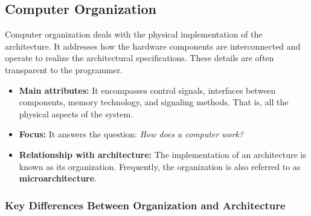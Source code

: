 \subsection{Computer Organization}
Computer organization deals with the physical implementation of the architecture. It addresses how the hardware components are interconnected and operate to realize the architectural specifications. These details are often transparent to the programmer.

\begin{itemize}
    \item \textbf{Main attributes:} It encompasses control signals, interfaces between components, memory technology, and signaling methods. That is, all the physical aspects of the system.
    \item \textbf{Focus:} It answers the question: \textit{How does a computer work?}
    \item \textbf{Relationship with architecture:} The implementation of an architecture is known as its organization. Frequently, the organization is also referred to as \textbf{microarchitecture}.
\end{itemize}

\subsubsection{Key Differences Between Organization and Architecture}

